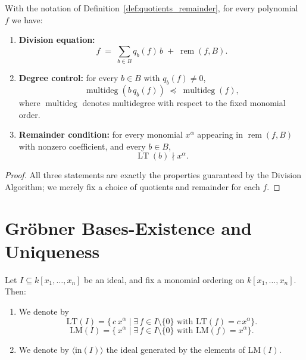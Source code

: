 \begin{lemma}\label{lem:remainder_spec}
  \leanok
  With the notation of Definition~\ref{def:quotients_remainder}, for every polynomial $f$ we have:
  \begin{enumerate}
    \item \textbf{Division equation:}
    \[
      f \;=\; \sum_{b\in B} q_b(f)\,b \;+\; \operatorname{rem}(f,B).
    \]
    \item \textbf{Degree control:} for every $b\in B$ with $q_b(f)\neq 0$,
    \[
      \operatorname{multideg}(b\,q_b(f)) \;\preceq\; \operatorname{multideg}(f),
    \]
    where $\operatorname{multideg}$ denotes multidegree with respect to the fixed monomial order.
    \item \textbf{Remainder condition:} for every monomial $x^\alpha$ appearing in $\operatorname{rem}(f,B)$
    with nonzero coefficient, and every $b\in B$,
    \[
      \operatorname{LT}(b) \nmid x^\alpha .
    \]
  \end{enumerate}
\end{lemma}

\begin{proof}
  \leanok
  All three statements are exactly the properties guaranteed by the Division Algorithm; we merely fix
  a choice of quotients and remainder for each $f$.
\end{proof}

\section{Gr{\"o}bner Bases-Existence and Uniqueness}

\begin{definition}
  \label{def:initialIdeal}
  \leanok 
  Let \(I\subseteq k[x_1,\dots,x_n]\) be an ideal, and fix a monomial ordering on \(k[x_1,\dots,x_n]\).  Then:
  \begin{enumerate}
    \item We denote by
    \[
      \mathrm{LT}(I)
      =
      \{\,c\,x^\alpha \mid \exists\,f\in I\setminus\{0\}\text{ with }\mathrm{LT}(f)=c\,x^\alpha\}.
    \]
    \[
      \mathrm{LM}(I)
      =
      \{\,x^\alpha \mid \exists\,f\in I\setminus\{0\}\text{ with }\mathrm{LM}(f)=x^\alpha\}.
    \]
    \item We denote by \(\langle \mathrm{in}(I)\rangle\) the ideal generated by the elements of \(\mathrm{LM}(I)\).
  \end{enumerate}
\end{definition}

